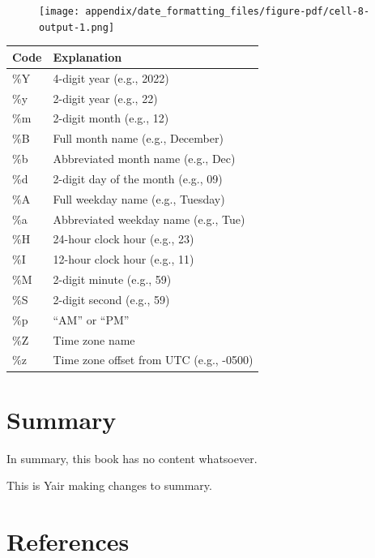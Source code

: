 \documentclass[
  letterpaper,
  DIV=11,
  numbers=noendperiod]{scrreprt}
\begin{document}
\begin{figure}[H]

{\centering \texttt{[image: appendix/date\_formatting\_files/figure-pdf/cell-8-output-1.png]}

}

\end{figure}

\begin{longtable}[]{@{}ll@{}}
\toprule()
Code & Explanation \\
\midrule()
\endhead
\%Y & 4-digit year (e.g., 2022) \\
\%y & 2-digit year (e.g., 22) \\
\%m & 2-digit month (e.g., 12) \\
\%B & Full month name (e.g., December) \\
\%b & Abbreviated month name (e.g., Dec) \\
\%d & 2-digit day of the month (e.g., 09) \\
\%A & Full weekday name (e.g., Tuesday) \\
\%a & Abbreviated weekday name (e.g., Tue) \\
\%H & 24-hour clock hour (e.g., 23) \\
\%I & 12-hour clock hour (e.g., 11) \\
\%M & 2-digit minute (e.g., 59) \\
\%S & 2-digit second (e.g., 59) \\
\%p & ``AM'' or ``PM'' \\
\%Z & Time zone name \\
\%z & Time zone offset from UTC (e.g., -0500) \\
\bottomrule()
\end{longtable}


\hypertarget{summary-1}{%
\chapter{Summary}\label{summary-1}}

In summary, this book has no content whatsoever.

This is Yair making changes to summary.


\hypertarget{references-1}{%
\chapter*{References}\label{references-1}}
\end{document}
